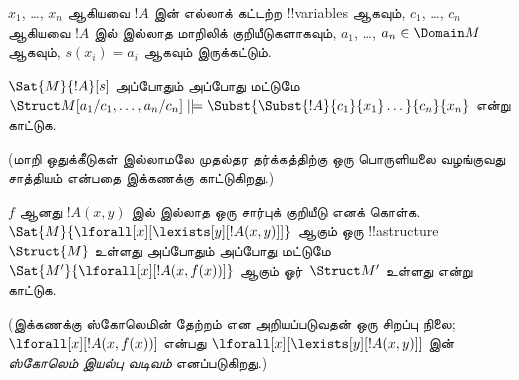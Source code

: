 \documentclass[../../../include/open-logic-section]{subfiles}
\begin{document}
\begin{prob}
\begin{enumerate}
\end{enumerate}
$x_1$, \dots, $x_n$ ஆகியவை $!A$ இன் எல்லாக் கட்டற்ற !!{variable}s
ஆகவும், $c_1$, \dots, $c_n$ ஆகியவை $!A$ இல் இல்லாத மாறிலிக்
குறியீடுகளாகவும், $a_1$, \dots, $a_n \in \Domain M$ ஆகவும்,
$s(x_i) = a_i$ ஆகவும் இருக்கட்டும்.

$\Sat{M}{!A}[s]$ அப்போதும் அப்போது மட்டுமே $\Struct M[a_1/c_1,\dots,a_n/c_n]
\VDash \Subst{\Subst{!A}{c_1}{x_1}\dots}{c_n}{x_n}$ என்று காட்டுக.

(மாறி ஒதுக்கீடுகள் இல்லாமலே முதல்தர தர்க்கத்திற்கு ஒரு பொருளியலை
வழங்குவது சாத்தியம் என்பதை இக்கணக்கு காட்டுகிறது.)
\end{prob}

\begin{prob}
$f$ ஆனது $!A(x,y)$ இல் இல்லாத ஒரு சார்புக் குறியீடு எனக் கொள்க.
$\Sat{M}{\lforall[x][\lexists[y][!A(x,y)]]}$ ஆகும் ஒரு
!!a{structure}~$\Struct{M}$ உள்ளது அப்போதும் அப்போது மட்டுமே
$\Sat{M'}{\lforall[x][!A(x,f(x))]}$ ஆகும் ஓர்~$\Struct M'$ உள்ளது
என்று காட்டுக.

(இக்கணக்கு ஸ்கோலெமின் தேற்றம் என அறியப்படுவதன் ஒரு சிறப்பு நிலை;
$\lforall[x][!A(x,f(x))]$ என்பது
$\lforall[x][\lexists[y][!A(x,y)]]$ இன் \emph{ஸ்கோலெம் இயல்பு வடிவம்}
எனப்படுகிறது.)
\end{prob}
\end{document}
